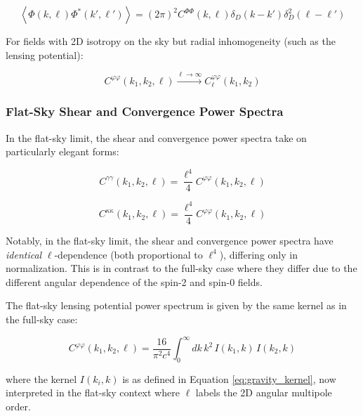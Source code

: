\begin{equation}
\left\langle \Phi(k, \boldsymbol{\ell}) \Phi^*(k', \boldsymbol{\ell}') \right\rangle = (2\pi)^2 C^{\Phi\Phi}(k, \ell) \delta_D(k - k') \delta_D^2(\boldsymbol{\ell} - \boldsymbol{\ell}')
\label{eq:flat_sky_power_def}
\end{equation}

For fields with 2D isotropy on the sky but radial inhomogeneity (such as the lensing potential):

\begin{equation}
C^{\varphi\varphi}(k_1, k_2, \ell) \xrightarrow{\ell \to \infty} C_\ell^{\varphi\varphi}(k_1, k_2)
\label{eq:high_ell_partial_iso}
\end{equation}

\subsubsection{Flat-Sky Shear and Convergence Power Spectra}

In the flat-sky limit, the shear and convergence power spectra take on particularly elegant forms:

\begin{equation}
C^{\gamma\gamma}(k_1, k_2, \ell) = \frac{\ell^4}{4} C^{\varphi\varphi}(k_1, k_2, \ell)
\label{eq:flat_sky_shear_power}
\end{equation}

\begin{equation}
C^{\kappa\kappa}(k_1, k_2, \ell) = \frac{\ell^4}{4} C^{\varphi\varphi}(k_1, k_2, \ell)
\label{eq:flat_sky_convergence_power}
\end{equation}

Notably, in the flat-sky limit, the shear and convergence power spectra have \emph{identical} $\ell$-dependence (both proportional to $\ell^4$), differing only in normalization. This is in contrast to the full-sky case where they differ due to the different angular dependence of the spin-2 and spin-0 fields.

The flat-sky lensing potential power spectrum is given by the same kernel as in the full-sky case:

\begin{equation}
C^{\varphi\varphi}(k_1, k_2, \ell) = \frac{16}{\pi^2 c^4} \int_0^\infty dk \, k^2 \, I(k_1, k) \, I(k_2, k)
\label{eq:flat_sky_lens_potential}
\end{equation}

where the kernel $I(k_i, k)$ is as defined in Equation \ref{eq:gravity_kernel}, now interpreted in the flat-sky context where $\ell$ labels the 2D angular multipole order.

